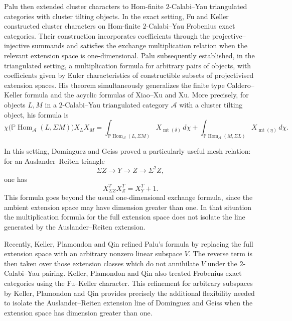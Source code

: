 \documentclass[11pt,reqno]{article}
\numberwithin{equation}{section}
\theoremstyle{definition}
\DeclareMathOperator{\Hom}{Hom}
\newcommand{\A}{\mathcal A}
\begin{document}
Palu \cite{Palu2008} then extended cluster characters to Hom-finite $2$-Calabi--Yau triangulated categories with cluster tilting objects.  In the exact setting, Fu and Keller \cite{FuKeller} constructed cluster characters on Hom-finite $2$-Calabi--Yau Frobenius exact categories.  Their construction incorporates coefficients through the projective--injective summands and satisfies the exchange multiplication relation when the relevant extension space is one-dimensional.  Palu \cite{Palu2012} subsequently established, in the triangulated setting, a multiplication formula for arbitrary pairs of objects, with coefficients given by Euler characteristics of constructible subsets of projectivised extension spaces.  His theorem simultaneously generalizes the finite type Caldero--Keller formula and the acyclic formulas of Xiao--Xu and Xu.  More precisely, for objects $L,M$ in a $2$-Calabi--Yau triangulated category $\A$ with a cluster tilting object, his formula is
\[
 \chi\bigl(\mathbb P\Hom_{\A}(L,\Sigma M)\bigr)X_LX_M
 =\int_{\mathbb P\Hom_{\A}(L,\Sigma M)}X_{\operatorname{mt}(\delta)}\,d\chi
 +\int_{\mathbb P\Hom_{\A}(M,\Sigma L)}X_{\operatorname{mt}(\eta)}\,d\chi.
\]

In this setting, Dominguez and Geiss \cite{DominguezGeiss} proved a particularly useful mesh relation: for an Auslander--Reiten triangle
\[
  \Sigma Z\longrightarrow Y\longrightarrow Z\longrightarrow\Sigma^2 Z,
\]
one has
\[
  X^T_{\Sigma Z}X^T_Z=X^T_Y+1.
\]
This formula goes beyond the usual one-dimensional exchange formula, since the ambient extension space may have dimension greater than one.  In that situation the multiplication formula for the full extension space does not isolate the line generated by the Auslander--Reiten extension.

Recently, Keller, Plamondon and Qin \cite{KellerPlamondonQin} refined Palu's formula by replacing the full extension space with an arbitrary nonzero linear subspace $V$.  The reverse term is then taken over those extension classes which do not annihilate $V$ under the $2$-Calabi--Yau pairing.  Keller, Plamondon and Qin \cite[Section~3]{KellerPlamondonQin} also treated Frobenius exact categories using the Fu--Keller character.  This refinement for arbitrary subspaces by Keller, Plamondon and Qin \cite{KellerPlamondonQin} provides precisely the additional flexibility needed to isolate the Auslander--Reiten extension line of Dominguez and Geiss \cite{DominguezGeiss} when the extension space has dimension greater than one.
\end{document}
